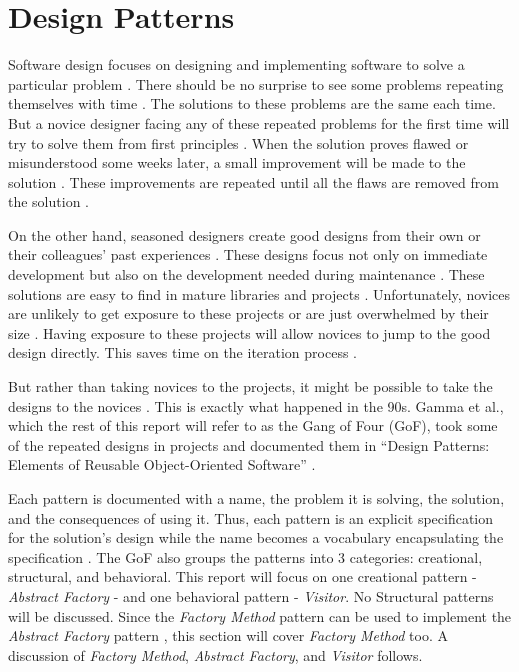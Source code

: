 \section{Design Patterns}
Software design focuses on designing and implementing software to solve a particular problem \cite{ieee_1016-2009, satzinger_15_01}.
There should be no surprise to see some problems repeating themselves with time \cite{keshvari_11_01}.
The solutions to these problems are the same each time.
But a novice designer facing any of these repeated problems for the first time will try to solve them from first principles \cite{gamma_94_01, sonnentag_98_01}.
When the solution proves flawed or misunderstood some weeks later, a small improvement will be made to the solution \cite{zhu_05_01, ieee_1016-2009}.
These improvements are repeated until all the flaws are removed from the solution \cite{stephens_15_01, satzinger_15_01}.

On the other hand, seasoned designers create good designs from their own or their colleagues' past experiences \cite{sonnentag_98_01}.
These designs focus not only on immediate development but also on the development needed during maintenance \cite{kerievsky_05_01,gamma_94_01}.
These solutions are easy to find in mature libraries and projects \cite{gamma_94_01}.
Unfortunately, novices are unlikely to get exposure to these projects \cite{zhu_05_01} or are just overwhelmed by their size \cite{hu_18_01}.
Having exposure to these projects will allow novices to jump to the good design directly.
This saves time on the iteration process \cite{satzinger_15_01}.

But rather than taking novices to the projects, it might be possible to take the designs to the novices \cite{kim_03_01}.
This is exactly what happened in the 90s.
Gamma et al., which the rest of this report will refer to as the Gang of Four (GoF), took some of the repeated designs in projects and documented them in ``Design Patterns: Elements of Reusable Object-Oriented Software'' \cite{gamma_94_01}.

Each pattern is documented with a name, the problem it is solving, the solution, and the consequences of using it.
Thus, each pattern is an explicit specification for the solution's design while the name becomes a vocabulary encapsulating the specification \cite{gamma_94_01, bulajic_12_01}.
The GoF also groups the patterns into 3 categories: creational, structural, and behavioral.
This report will focus on one creational pattern - \textit{Abstract Factory} - and one behavioral pattern - \textit{Visitor}.
No Structural patterns will be discussed.
Since the \textit{Factory Method} pattern can be used to implement the \textit{Abstract Factory} pattern \cite{nykonenko_12_01, gamma_94_01}, this section will cover \textit{Factory Method} too.
A discussion of \textit{Factory Method}, \textit{Abstract Factory}, and \textit{Visitor} follows.

